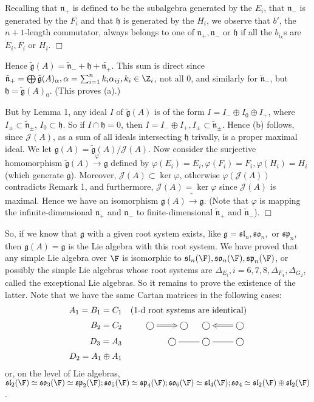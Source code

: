 \documentclass[11pt]{article}
\newcommand{\sll}{\mathfrak{sl}}
\newcommand{\so}{\mathfrak{so}}
\newcommand{\spp}{\mathfrak{sp}}
\newcommand{\g}{\mathfrak{g}}
\newcommand{\h}{\mathfrak{h}}
\newcommand{\n}{\mathfrak{n}}
\begin{document}
Recalling that $\n_+$ is defined to be the subalgebra generated by the
$E_i$, that $\n_-$ is generated by the $F_i$ and that $\h$ is
generated by the $H_i$, we observe that $b'$, the $n+1$-length
commutator, always belongs to one of $\n_+, \n_-$ or $\h$ if all
the $b_{i_k}$s are $E_i, F_i$ or $H_i$. $\Box$

Hence $\tilde{\g}(A) = \tilde{\n}_- + \h + \tilde{\n_+}$.  This sum is
direct since $\tilde{\n}_+ = \bigoplus \tilde{\g}(A)_\alpha, \alpha =
\sum_{i=1}^n k_i \alpha_{ij}, k_i \in \Z_i$, not all 0,
and similarly for $\tilde{\n}_-$, but $\h = \tilde{\g}(A)_0$.  
(This proves (a).)  

But by Lemma 1, any ideal $I$ of $\tilde{\g}(A)$ is of the form
$I = I_- \oplus I_0 \oplus I_+$, where $I_\pm \subset \tilde{\n}_\pm$,
$I_0 \subset \h$.  So if $I \cap \h = 0$, then $I = I_- \oplus I_+,
I_\pm \subset \tilde{\n}_\pm$.  Hence (b) follows, since
$\mathcal{J}(A)$, as a sum of all ideals intersecting $\h$ trivally,
is a proper maximal ideal.  We let $\g(A) = \tilde{\g}(A) / \mathcal{J}(A)$.
Now consider the surjective homomorphism $\tilde{\g}(A) 
\stackrel{\varphi}{\rightarrow} \g$ defined by
$\varphi(E_i) = E_i, \varphi(F_i) = F_i, \varphi(H_i) = H_i$ 
(which generate $\g$).  Moreover, $\mathcal{J}(A) \subset \ker \varphi$,
otherwise $\varphi(\mathcal{J}(A))$ contradicts Remark 1, and furthermore,
$\mathcal{J}(A) = \ker \varphi$ since $\mathcal{J}(A)$ is maximal.  Hence
we have an isomorphism $\g(A) \tilde{\rightarrow} \g$.
(Note that $\varphi$ is mapping the infinite-dimensional $\n_+$ and 
$\n_-$ to finite-dimensional $\tilde{\n}_+$ and $\tilde{\n}_-$). $\Box$

So, if we know that $\g$ with a given root system exists, like $\g =
\sll_n, \so_n, \mbox{ or } \spp_n$, then $\g(A) = \g$ is the Lie
algebra with this root system.  We have proved that any simple Lie
algebra over $\F$ is isomorphic to $\sll_n(\F), \so_n(\F),
\spp_n(\F)$, or possibly the simple Lie algebras whose root systems
are $\Delta_{E_i}, i = 6, 7, 8, \Delta_{F_4}, \Delta_{G_2}$, called the
exceptional Lie algebras.  So it remains to prove the existence of the
latter.  Note that we have the same Cartan matrices in the following 
cases:
\begin{eqnarray*}
A_1 = B_1 = C_1 && \mbox{(1-d root systems are identical)}\\
B_2 = C_2 && 
\xymatrix{ {\bigcirc} \ar@{=>}[r]& {\bigcirc}} \quad
\xymatrix{ {\bigcirc} \ar@{<=}[r]& {\bigcirc}}\\
D_3 = A_3 &&
\xymatrix{ {\bigcirc} \ar@{-}[r]& {\bigcirc}\ar@{-}[r]& {\bigcirc}}
\\
D_2 = A_1 \oplus A_1
\end{eqnarray*}
or, on the level of Lie algebras, $\sll_2(\F) \simeq \so_3(\F) 
\simeq \spp_2(\F); \so_5(\F) \simeq \spp_4(\F); 
\so_6 (\F) \simeq \sll_4(\F); \so_4 \simeq \sll_2 (\F)
\oplus \sll_2(\F)$.
\end{document}
